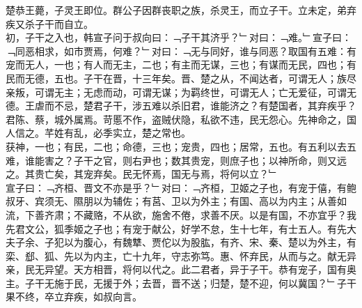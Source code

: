 {楚恭王薨，子灵王即位。群公子因群丧职之族，杀灵王，而立子干。立未定，弟弃疾又杀子干而自立。\\
初，子干之入也，韩宣子问于叔向曰：﹁子干其济乎？﹂对曰：﹁难。﹂宣子曰：﹁同恶相求，如市贾焉，何难？﹂对曰：﹁无与同好，谁与同恶？取国有五难：有宠而无人，一也；有人而无主，二也；有主而无谋，三也；有谋而无民，四也；有民而无德，五也。子干在晋，十三年矣。晋、楚之从，不闻达者，可谓无人；族尽亲叛，可谓无主；无虑而动，可谓无谋；为羁终世，可谓无人；亡无爱征，可谓无德。王虐而不忌，楚君子干，涉五难以杀旧君，谁能济之？有楚国者，其弃疾乎？君陈、蔡，城外属焉。苛慝不作，盗贼伏隐，私欲不违，民无怨心。先神命之，国人信之。芊姓有乱，必季实立，楚之常也。\\
获神，一也；有民，二也；命德，三也；宠贵，四也；居常，五也。有五利以去五难，谁能害之？子干之官，则右尹也；数其贵宠，则庶子也；以神所命，则又远之。其贵亡矣，其宠弃矣。民无怀焉，国无与焉，将何以立？﹂\\
宣子曰：﹁齐桓、晋文不亦是乎？﹂对曰：﹁齐桓，卫姬之子也，有宠于僖，有鲍叔牙、宾须无、隰朋以为辅佐；有莒、卫以为外主；有国、高以为内主；从善如流，下善齐肃；不藏赂，不从欲，施舍不倦，求善不厌。以是有国，不亦宜乎？我先君文公，狐季姬之子也；有宠于献公，好学不怠，生十七年，有士五人。有先大夫子余、子犯以为腹心，有魏犨、贾佗以为股肱，有齐、宋、秦、楚以为外主，有栾、郄、狐、先以为内主，亡十九年，守志弥笃。惠、怀弃民，从而与之。献无异亲，民无异望。天方相晋，将何以代之。此二君者，异于子干。恭有宠子，国有奥主。子干无施于民，无援于外；去晋，晋不送；归楚，楚不迎，何以冀国？﹂子干果不终，卒立弃疾，如叔向言。
\\
}
